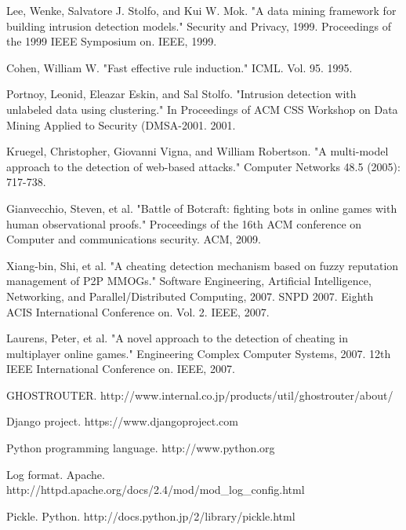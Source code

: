 \documentclass[a4paper,11pt]{jsarticle}
\begin{document}
\newpage
\begin{thebibliography}{99}

Lee, Wenke, Salvatore J. Stolfo, and Kui W. Mok. "A data mining framework for building intrusion detection models." Security and Privacy, 1999. Proceedings of the 1999 IEEE Symposium on. IEEE, 1999.

Cohen, William W. "Fast effective rule induction." ICML. Vol. 95. 1995.

Portnoy, Leonid, Eleazar Eskin, and Sal Stolfo. "Intrusion detection with unlabeled data using clustering." In Proceedings of ACM CSS Workshop on Data Mining Applied to Security (DMSA-2001. 2001.

Kruegel, Christopher, Giovanni Vigna, and William Robertson. "A multi-model approach to the detection of web-based attacks." Computer Networks 48.5 (2005): 717-738.

Gianvecchio, Steven, et al. "Battle of Botcraft: fighting bots in online games with human observational proofs." Proceedings of the 16th ACM conference on Computer and communications security. ACM, 2009.

Xiang-bin, Shi, et al. "A cheating detection mechanism based on fuzzy reputation management of P2P MMOGs." Software Engineering, Artificial Intelligence, Networking, and Parallel/Distributed Computing, 2007. SNPD 2007. Eighth ACIS International Conference on. Vol. 2. IEEE, 2007.

Laurens, Peter, et al. "A novel approach to the detection of cheating in multiplayer online games." Engineering Complex Computer Systems, 2007. 12th IEEE International Conference on. IEEE, 2007.

GHOSTROUTER. http://www.internal.co.jp/products/util/ghostrouter/about/

Django project. https://www.djangoproject.com

Python programming language. http://www.python.org

Log format. Apache. http://httpd.apache.org/docs/2.4/mod/mod\_log\_config.html

Pickle. Python. http://docs.python.jp/2/library/pickle.html

\end{thebibliography}

%
%
\end{document}
